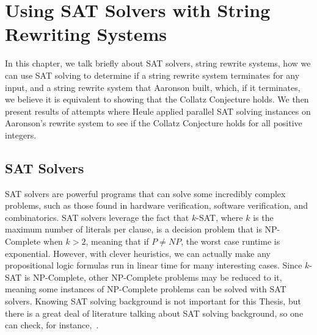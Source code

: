 \chapter{Using SAT Solvers with String Rewriting Systems} \label{sec:SRSandSAT}
In this chapter, we talk briefly about SAT solvers, string rewrite systems, how we can use SAT solving to determine if a string rewrite system terminates for any input, and a string rewrite system that Aaronson built, which, if it terminates, we believe it is equivalent to showing that the Collatz Conjecture holds. We then present results of attempts where Heule applied parallel SAT solving instances on Aaronson's rewrite system to see if the Collatz Conjecture holds for all positive integers.
\section{SAT Solvers}
SAT solvers are powerful programs that can solve some incredibly complex problems, such as those found in hardware verification, software verification, and combinatorics. SAT solvers leverage the fact that $k$-SAT, where $k$ is the maximum number of literals per clause, is a decision problem that is NP-Complete when $k > 2$, meaning that if $P \ne NP$, the worst case runtime is exponential. However, with clever heuristics, we can actually make any propositional logic formulas run in linear time for many interesting cases. Since $k$-SAT is NP-Complete, other NP-Complete problems may be reduced to it, meaning some instances of NP-Complete problems can be solved with SAT solvers. Knowing SAT solving background is not important for this Thesis, but there is a great deal of literature talking about SAT solving background, so one can check, for instance,~\cite{Biere:2009:HSV:1550723}.
